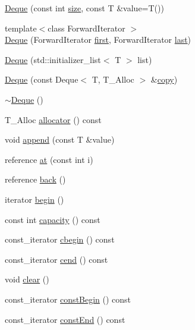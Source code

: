 \begin{DoxyCompactItemize}
\item 
\hyperlink{namespaceprism_a73ec48544ee84c6327a63ac5c4c5cb60}{Deque} (const int \hyperlink{namespaceprism_acd3c0f96adf158a29387191d79c4d874}{size}, const T \&value=T())
\item 
{\footnotesize template$<$class Forward\+Iterator $>$ }\\\hyperlink{namespaceprism_aa7bbb75108907fb0573f35d3b82ddf3a}{Deque} (Forward\+Iterator \hyperlink{namespaceprism_ae3fb7a1926a9e8e59300cd5e370470da}{first}, Forward\+Iterator \hyperlink{namespaceprism_abe4956c4e865f55ca126b7fb973b5078}{last})
\item 
\hyperlink{namespaceprism_a6d8b2ede230218b04aa9b6f48c94f77d}{Deque} (std\+::initializer\+\_\+list$<$ T $>$ list)
\item 
\hyperlink{namespaceprism_af8a6c6b9242eb9a0c22af9e28ee4ae80}{Deque} (const Deque$<$ T, T\+\_\+\+Alloc $>$ \&\hyperlink{namespaceprism_ae776f4cd825f79e7af1cf6ee1d90a209}{copy})
\item 
\hyperlink{namespaceprism_a331c22c8877ca45c3f9504b1fbfb711c}{$\sim$\+Deque} ()
\item 
T\+\_\+\+Alloc \hyperlink{namespaceprism_af48d4e417d7dc90cd7979795347e1718}{allocator} () const 
\item 
void \hyperlink{namespaceprism_afc3c0da5e0e065dd58d686f551746982}{append} (const T \&value)
\item 
reference \hyperlink{namespaceprism_a675cbab48f22d95f990b33294a447dfe}{at} (const int i)
\item 
reference \hyperlink{namespaceprism_a32fa4c8645ce4e3df7586e5a9f50c768}{back} ()
\item 
iterator \hyperlink{namespaceprism_a05fcc740caf535a0f4ee6bba7301cf7f}{begin} ()
\item 
const int \hyperlink{namespaceprism_a7f11d607fd7daaeaf07d7b83e1add209}{capacity} () const 
\item 
const\+\_\+iterator \hyperlink{namespaceprism_acd7a4333c9a67559cfd90bb6d1c85420}{cbegin} () const 
\item 
const\+\_\+iterator \hyperlink{namespaceprism_a0247b88b3e29f34b1cb742d724a6a330}{cend} () const 
\item 
void \hyperlink{namespaceprism_ad22144cb445517f69b2e6f76586cf75d}{clear} ()
\item 
const\+\_\+iterator \hyperlink{namespaceprism_a8f07ef2e7db05a23c631dee99ad4eba3}{const\+Begin} () const 
\item 
const\+\_\+iterator \hyperlink{namespaceprism_a61b5e8524d7d3106a0b01cd002af8f75}{const\+End} () const 

\end{DoxyCompactItemize}
